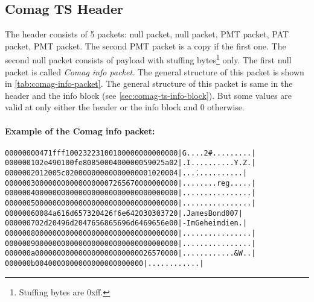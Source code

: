 \documentclass{scrartcl}
\begin{document}
\subsection{Comag TS Header}
\label{sec:comag-ts-header}

The header consists of 5 packets: null packet, null packet, PMT packet, PAT
packet, PMT packet. The second PMT packet is a copy if the first one. The
second null packet consists of payload with stuffing bytes\footnote{Stuffing
  bytes are 0xff.} only. The first null packet is called \emph{Comag info
  packet}. The general structure of this packet is shown in
\autoref{tab:comag-info-packet}. The general structure of this packet is same
in the header and the info block (see \autoref{sec:comag-ts-info-block}). But
some values are valid at only either the header or the info block and 0
otherwise.

\paragraph{Example of the Comag info packet:}
{\small
\begin{alltt}
00000000  47 1f ff 10 02 32 23 10  01 00 00 00 00 00 00 00  |G....2#.........|
00000010  2e 49 01 00 fe 80 85 00  04 00 00 00 59 02 5a 02  |.I..........Y.Z.|
00000020  12 00 5c 02 00 00 00 00  00 00 00 00 01 02 00 04  |..\.............|
00000030  00 00 00 00 00 00 00 00  72 65 67 00 00 00 00 00  |........reg.....|
00000040  00 00 00 00 00 00 00 00  00 00 00 00 00 00 00 00  |................|
00000050  00 00 00 00 00 00 00 00  00 00 00 00 00 00 00 00  |................|
00000060  08 4a 61 6d 65 73 20 42  6f 6e 64 20 30 30 37 20  |.James Bond 007 |
00000070  2d 20 49 6d 20 47 65 68  65 69 6d 64 69 65 6e 00  |- Im Geheimdien.|
00000080  00 00 00 00 00 00 00 00  00 00 00 00 00 00 00 00  |................|
00000090  00 00 00 00 00 00 00 00  00 00 00 00 00 00 00 00  |................|
000000a0  00 00 00 00 00 00 00 00  00 00 00 00 26 57 00 00  |............&W..|
000000b0  04 00 00 00 00 00 00 00  00 00 00 00              |............|
\end{alltt}
}
\end{document}
